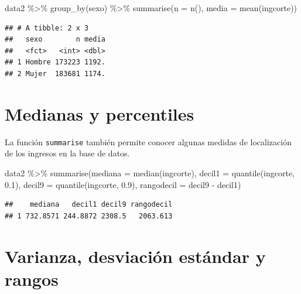 \documentclass[
  12pt,
]{book}
\newenvironment{Shaded}{\begin{snugshade}}{\end{snugshade}}
\newcommand{\AttributeTok}[1]{\textcolor[rgb]{0.77,0.63,0.00}{#1}}
\newcommand{\FloatTok}[1]{\textcolor[rgb]{0.00,0.00,0.81}{#1}}
\newcommand{\FunctionTok}[1]{\textcolor[rgb]{0.00,0.00,0.00}{#1}}
\newcommand{\NormalTok}[1]{#1}
\newcommand{\SpecialCharTok}[1]{\textcolor[rgb]{0.00,0.00,0.00}{#1}}
\begin{document}
\begin{Shaded}
\begin{Highlighting}[]
\NormalTok{data2 }\SpecialCharTok{\%\textgreater{}\%} \FunctionTok{group\_by}\NormalTok{(sexo) }\SpecialCharTok{\%\textgreater{}\%}
  \FunctionTok{summarise}\NormalTok{(}\AttributeTok{n =} \FunctionTok{n}\NormalTok{(),}
            \AttributeTok{media =} \FunctionTok{mean}\NormalTok{(ingcorte))}
\end{Highlighting}
\end{Shaded}

\begin{verbatim}
## # A tibble: 2 x 3
##   sexo        n media
##   <fct>   <int> <dbl>
## 1 Hombre 173223 1192.
## 2 Mujer  183681 1174.
\end{verbatim}

\hypertarget{medianas-y-percentiles}{%
\section{Medianas y percentiles}\label{medianas-y-percentiles}}

La función \texttt{summarise} también permite conocer algunas medidas de localización de los ingresos en la base de datos.

\begin{Shaded}
\begin{Highlighting}[]
\NormalTok{data2 }\SpecialCharTok{\%\textgreater{}\%} \FunctionTok{summarise}\NormalTok{(}\AttributeTok{mediana =} \FunctionTok{median}\NormalTok{(ingcorte),}
                    \AttributeTok{decil1 =} \FunctionTok{quantile}\NormalTok{(ingcorte, }\FloatTok{0.1}\NormalTok{),}
                    \AttributeTok{decil9 =} \FunctionTok{quantile}\NormalTok{(ingcorte, }\FloatTok{0.9}\NormalTok{),}
                    \AttributeTok{rangodecil =}\NormalTok{ decil9 }\SpecialCharTok{{-}}\NormalTok{ decil1)}
\end{Highlighting}
\end{Shaded}

\begin{verbatim}
##    mediana   decil1 decil9 rangodecil
## 1 732.8571 244.8872 2308.5   2063.613
\end{verbatim}

\hypertarget{varianza-desviaciuxf3n-estuxe1ndar-y-rangos}{%
\section{Varianza, desviación estándar y rangos}\label{varianza-desviaciuxf3n-estuxe1ndar-y-rangos}}
\end{document}
